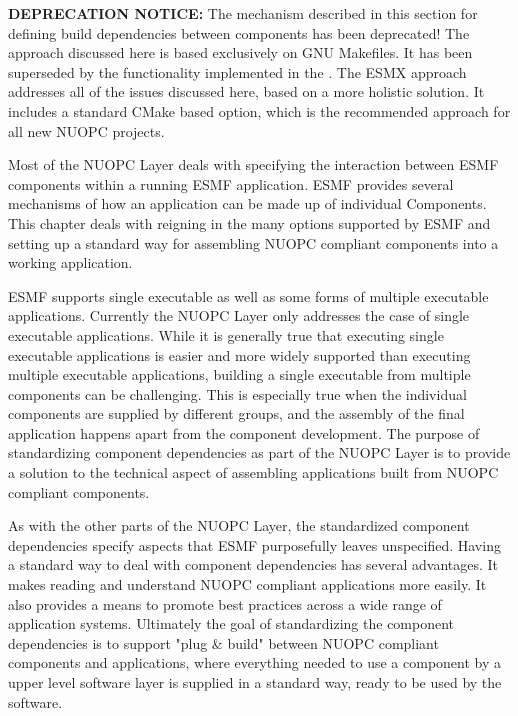 
\label{componentDep}

{\bf DEPRECATION NOTICE:} The mechanism described in this section for defining build dependencies between components has been deprecated! The approach discussed here is based exclusively on GNU Makefiles. It has been superseded by the functionality implemented in the . The ESMX approach addresses all of the issues discussed here, based on a more holistic solution. It includes a standard CMake based option, which is the recommended approach for all new NUOPC projects.

Most of the NUOPC Layer deals with specifying the interaction between ESMF components within a running ESMF application. ESMF provides several mechanisms of how an application can be made up of individual Components. This chapter deals with reigning in the many options supported by ESMF and setting up a standard way for assembling NUOPC compliant components into a working application.

ESMF supports single executable as well as some forms of multiple executable applications. Currently the NUOPC Layer only addresses the case of single executable applications. While it is generally true that executing single executable applications is easier and more widely supported than executing multiple executable applications, building a single executable from multiple components can be challenging. This is especially true when the individual components are supplied by different groups, and the assembly of the final application happens apart from the component development. The purpose of standardizing component dependencies as part of the NUOPC Layer is to provide a solution to the technical aspect of assembling applications built from NUOPC compliant components.

As with the other parts of the NUOPC Layer, the standardized component dependencies specify aspects that ESMF purposefully leaves unspecified. Having a standard way to deal with component dependencies has several advantages. It makes reading and understand NUOPC compliant applications more easily. It also provides a means to promote best practices across a wide range of application systems. Ultimately the goal of standardizing the component dependencies is to support "plug \& build" between NUOPC compliant components and applications, where everything needed to use a component by a upper level software layer is supplied in a standard way, ready to be used by the software.

